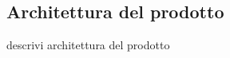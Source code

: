 \documentclass[../manuale-sviluppatore.tex]{subfiles}
\begin{document}
\subsection{Architettura del prodotto}%
\label{sub:architettura_del_prodotto}

descrivi architettura del prodotto






\end{document}
